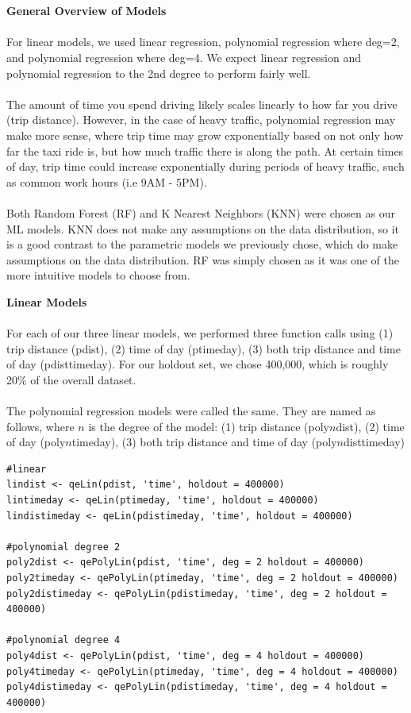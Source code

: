 \documentclass[letterpaper, 12 pt, conference]{article}
\begin{document}
\\
\\
\textbf{General Overview of Models}
\\
\\For linear models, we used linear regression, polynomial regression where deg=2, and polynomial regression where deg=4. We expect linear regression and polynomial regression to the 2nd degree to perform fairly well. 
\\
\\The amount of time you spend driving likely scales linearly to how far you drive (trip distance). However, in the case of heavy traffic, polynomial regression may make more sense, where trip time may grow exponentially based on not only how far the taxi ride is, but how much traffic there is along the path. At certain times of day, trip time could increase exponentially during periods of heavy traffic, such as common work hours (i.e 9AM - 5PM). 
\\
\\Both Random Forest (RF) and K Nearest Neighbors (KNN) were chosen as our ML models. KNN does not make any assumptions on the data distribution, so it is a good contrast to the parametric models we previously chose, which do make assumptions on the data distribution. RF was simply chosen as it was one of the more intuitive models to choose from. 


\textbf{Linear Models}
\\
\\For each of our three linear models, we performed three function calls using (1) trip distance (pdist), (2) time of day (ptimeday), (3) both trip distance and time of day (pdisttimeday). For our holdout set, we chose 400,000, which is roughly 20\% of the overall dataset. 
\\
\\The polynomial regression models were called the same. They are named as follows, where $n$ is the degree of the model: (1) trip distance (poly$n$dist), (2) time of day (poly$n$timeday), (3) both trip distance and time of day (poly$n$disttimeday)

\begin{lstlisting}
#linear 
lindist <- qeLin(pdist, 'time', holdout = 400000)
lintimeday <- qeLin(ptimeday, 'time', holdout = 400000)
lindistimeday <- qeLin(pdistimeday, 'time', holdout = 400000)

#polynomial degree 2 
poly2dist <- qePolyLin(pdist, 'time', deg = 2 holdout = 400000)      
poly2timeday <- qePolyLin(ptimeday, 'time', deg = 2 holdout = 400000)        
poly2distimeday <- qePolyLin(pdistimeday, 'time', deg = 2 holdout = 400000)   

#polynomial degree 4
poly4dist <- qePolyLin(pdist, 'time', deg = 4 holdout = 400000)
poly4timeday <- qePolyLin(ptimeday, 'time', deg = 4 holdout = 400000)
poly4distimeday <- qePolyLin(pdistimeday, 'time', deg = 4 holdout = 400000)
\end{lstlisting}
\end{document}
